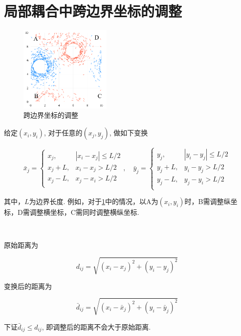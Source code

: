 \documentclass{article}
\begin{document}
\section{局部耦合中跨边界坐标的调整}\label{positionAdj}

\begin{figure}[htbp]
    \centering
    \includegraphics[width=0.4\textwidth]{./figs/fig1.jpg}
    \caption{跨边界坐标的调整}
    \label{fig:fig22}
\end{figure}

给定$(x_i, y_i)$, 对于任意的$(x_j, y_j)$, 做如下变换

\begin{equation}\label{eq:eq1}
	\bar{x}_j=\begin{cases}
		x_j,&		|x_i-x_j|\le L/2\\
		x_j+L,&		x_i-x_j>L/2\\
		x_j-L,&		x_j-x_i>L/2\\
	\end{cases} ,\quad
	\bar{y}_j=\begin{cases}
		y_j,&		|y_i-y_j|\le L/2\\
		y_j+L,&		y_i-y_j>L/2\\
		y_j-L,&		y_j-y_i>L/2\\
	\end{cases}
\end{equation}

其中，$L$为边界长度. 例如，对于\ref{fig:fig22}中的情况，以A为$(x_i, y_i)$时，B需调整纵坐标，D需调整横坐标，C需同时调整横纵坐标.

$\ $

原始距离为

$$
d_{ij}=\sqrt{(x_i-x_j)^2+(y_i-y_j)^2}
$$

变换后的距离为

$$
\bar{d}_{ij}=\sqrt{(x_i-\bar{x}_j)^2+(y_i-\bar{y}_j)^2}
$$

下证$\bar{d}_{ij} \le d_{ij}$, 即调整后的距离不会大于原始距离.

$ $
\end{document}

